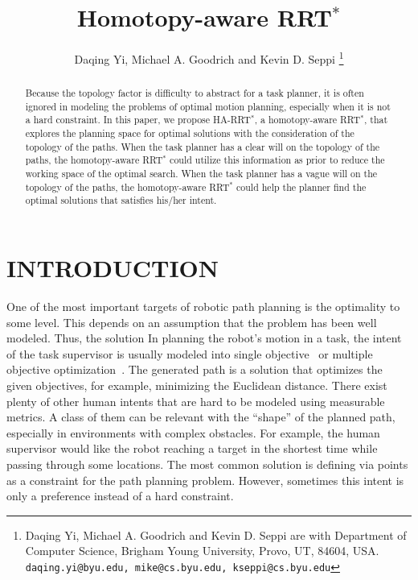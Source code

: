 \documentclass[letterpaper, 10 pt, conference]{ieeeconf}
\title{\LARGE \bf
Homotopy-aware RRT$^{*}$
}
\author{
Daqing Yi, Michael A. Goodrich and Kevin D. Seppi
\thanks{Daqing Yi, Michael A. Goodrich and Kevin D. Seppi are with Department of Computer Science, Brigham Young University, Provo, UT, 84604, USA.
{\tt\small daqing.yi@byu.edu, mike@cs.byu.edu, kseppi@cs.byu.edu} }
}
\begin{document}
\maketitle
\thispagestyle{empty}
\pagestyle{empty}


\begin{abstract}
Because the topology factor is difficulty to abstract for a task planner, it is often ignored in modeling the problems of optimal motion planning, especially when it is not a hard constraint.
In this paper, we propose HA-RRT$^{*}$, a homotopy-aware RRT$^{*}$, that explores the planning space for optimal solutions with the consideration of the topology of the paths.
When the task planner has a clear will on the topology of the paths, the homotopy-aware RRT$^{*}$ could utilize this information as prior to reduce the working space of the optimal search.
When the task planner has a vague will on the topology of the paths, the homotopy-aware RRT$^{*}$ could help the planner find the optimal solutions that satisfies his/her intent.


\end{abstract}

\section{INTRODUCTION}
\label{sec:intro}

One of the most important targets of robotic path planning is the optimality to some level.
This depends on an assumption that the problem has been well modeled.
Thus, the solution 
In planning the robot's motion in a task, the intent of the task supervisor is usually modeled into single objective~\cite{6974170} or multiple objective optimization~\cite{yi2014supporting}.
The generated path is a solution that optimizes the given objectives, for example, minimizing the Euclidean distance.
There exist plenty of other human intents that are hard to be modeled using measurable metrics.
A class of them can be relevant with the ``shape'' of the planned path, especially in environments with complex obstacles.
For example, the human supervisor would like the robot reaching a target in the shortest time while passing through some locations.
The most common solution is defining via points as a constraint for the path planning problem.
However, sometimes this intent is only a preference instead of a hard constraint.
\end{document}
